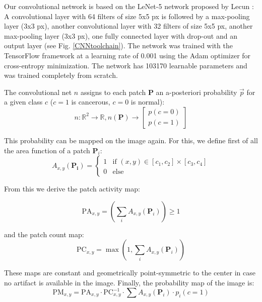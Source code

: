 \documentclass[fleqn,10pt]{wlscirep}
\begin{document}
Our convolutional network is based on the LeNet-5 network proposed by Lecun
\cite{LeCun:1998fv}: A convolutional layer with 64 filters of size 5x5 px is followed
by a max-pooling layer (3x3 px), another convolutional layer with 32
filters of size 5x5 px, another max-pooling layer (3x3 px), one fully connected layer with drop-out and an output
layer (see Fig. \ref{CNNtoolchain}). The network was trained with
the TensorFlow framework \cite{Abadi:2016vn} at a
learning rate of 0.001 using the Adam optimizer \cite{Kingma:2014us} for cross-entropy minimization. The network has 103170 learnable parameters and was trained completely from scratch.

The convolutional net $n$ assigns to each patch $\textbf{P}$ an a-posteriori probability $\vec{p}$ for a given class $c$ ($c=1$ is cancerous, $c=0$ is normal):
\begin{equation}
n: \mathbb{R}^2 \rightarrow \mathbb{R}, n(\textbf{P}) \rightarrow
\left[ \begin{matrix}p({c=0}) \\ p({c=1}) \end{matrix} \right]
\end{equation}

This probability can be mapped on the image again. For this, we define
first of all the area function of a patch $\textbf{P}_i$:
\begin{equation}
A_{x, y}(\mathbf{P_i}) = \begin{cases}1 & \text{if } (x, y) \in [c_{1}, c_{2}] \times [c_{3}, c_{4}]\\
0 & \text{else}
\end{cases}
\end{equation}

From this we derive the patch activity map:

\begin{equation}
\mathrm{PA}_{x,y} = \left( \sum_i A _{x,y} (\textbf{P}_i) \right) \geq 1
\end{equation}

and the patch count map:
\begin{equation}
\mathrm{PC}_{x,y} = \max \left( 1, \sum_i A _{x,y} ( \textbf{P}_i ) \right)
\end{equation}

These maps are constant and geometrically point-symmetric to the
center in case no artifact is available in the image. Finally, the probability map of the image is:
\begin{equation}
\mathrm{PM}_{x,y} = \mathrm{PA}_{x,y} \cdot \mathrm{PC}_{x,y}^{-1} \cdot\sum{ A_{x,y}(\textbf{P}_i) \cdot p_i(c=1)}
\end{equation}
\end{document}
